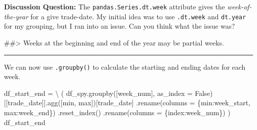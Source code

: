 \documentclass[
  letterpaper,
  DIV=11,
  numbers=noendperiod]{scrreprt}
\newenvironment{Shaded}{\begin{snugshade}}{\end{snugshade}}
\newcommand{\BuiltInTok}[1]{\textcolor[rgb]{0.00,0.23,0.31}{#1}}
\newcommand{\CommentTok}[1]{\textcolor[rgb]{0.37,0.37,0.37}{#1}}
\newcommand{\NormalTok}[1]{\textcolor[rgb]{0.00,0.23,0.31}{#1}}
\newcommand{\OperatorTok}[1]{\textcolor[rgb]{0.37,0.37,0.37}{#1}}
\newcommand{\StringTok}[1]{\textcolor[rgb]{0.13,0.47,0.30}{#1}}
\newcommand{\VariableTok}[1]{\textcolor[rgb]{0.07,0.07,0.07}{#1}}
\begin{document}
\textbf{Discussion Question:} The \texttt{pandas.Series.dt.week}
attribute gives the \emph{week-of-the-year} for a give trade-date. My
initial idea was to use \texttt{.dt.week} and \texttt{dt.year} for my
grouping, but I ran into an issue. Can you think what the issue was?

\begin{Shaded}
\begin{Highlighting}[]
\CommentTok{\#\#\textgreater{} Weeks at the beginning and end of the year may be partial weeks.}
\end{Highlighting}
\end{Shaded}

\begin{center}\rule{0.5\linewidth}{0.5pt}\end{center}

We can now use \texttt{.groupby()} to calculate the starting and ending
dates for each week.

\begin{Shaded}
\begin{Highlighting}[]
\NormalTok{df\_start\_end }\OperatorTok{=} \OperatorTok{\textbackslash{}}
\NormalTok{    (}
\NormalTok{    df\_spy.groupby([}\StringTok{\textquotesingle{}week\_num\textquotesingle{}}\NormalTok{], as\_index }\OperatorTok{=} \VariableTok{False}\NormalTok{)[[}\StringTok{\textquotesingle{}trade\_date\textquotesingle{}}\NormalTok{]].agg([}\BuiltInTok{min}\NormalTok{, }\BuiltInTok{max}\NormalTok{])[}\StringTok{\textquotesingle{}trade\_date\textquotesingle{}}\NormalTok{]}
\NormalTok{    .rename(columns }\OperatorTok{=}\NormalTok{ \{}\StringTok{\textquotesingle{}min\textquotesingle{}}\NormalTok{:}\StringTok{\textquotesingle{}week\_start\textquotesingle{}}\NormalTok{, }\StringTok{\textquotesingle{}max\textquotesingle{}}\NormalTok{:}\StringTok{\textquotesingle{}week\_end\textquotesingle{}}\NormalTok{\})}
\NormalTok{    .reset\_index()}
\NormalTok{    .rename(columns }\OperatorTok{=}\NormalTok{ \{}\StringTok{\textquotesingle{}index\textquotesingle{}}\NormalTok{:}\StringTok{\textquotesingle{}week\_num\textquotesingle{}}\NormalTok{\})}
\NormalTok{    )}
\NormalTok{df\_start\_end}
\end{Highlighting}
\end{Shaded}
\end{document}
